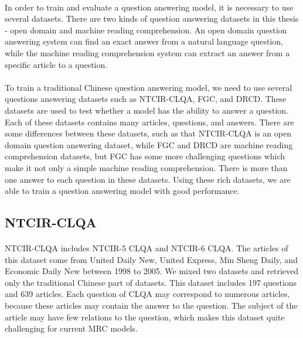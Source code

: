 \documentclass{article}
\begin{document}
\paragraph{}
In order to train and evaluate a question answering model, it is necessary to use several datasets. There are two kinds of question answering datasets in this thesis - open domain and machine reading comprehension. An open domain question answering system can find an exact answer from a natural language question, while the machine reading comprehension system can extract an answer from a specific article to a question.
\paragraph{}
To train a traditional Chinese question answering model, we need to use several questions answering datasets such as NTCIR-CLQA, FGC, and DRCD. These datasets are used to test whether a model has the ability to answer a question. Each of these datasets contains many articles, questions, and answers. There are some differences between these datasets, such as that NTCIR-CLQA is an open domain question answering dataset, while FGC and DRCD are machine reading comprehension datasets, but FGC has some more challenging questions which make it not only a simple machine reading comprehension. There is more than one answer to each question in these datasets. Using these rich datasets, we are able to train a question answering model with good performance.


\subsection{NTCIR-CLQA}
\paragraph{}
NTCIR-CLQA includes NTCIR-5 CLQA\cite{sasaki2005ntcir5} and NTCIR-6\cite{sasaki2005ntcir6} CLQA. The articles of this dataset come from United Daily New, United Express, Min Sheng Daily, and Economic Daily New between 1998 to 2005. We mixed two datasets and retrieved only the traditional Chinese part of datasets. This dataset includes 197 questions and 639 articles. Each question of CLQA may correspond to numerous articles, because these articles may contain the answer to the question. The subject of the article may have few relations to the question, which makes this dataset quite challenging for current MRC models.
\end{document}
